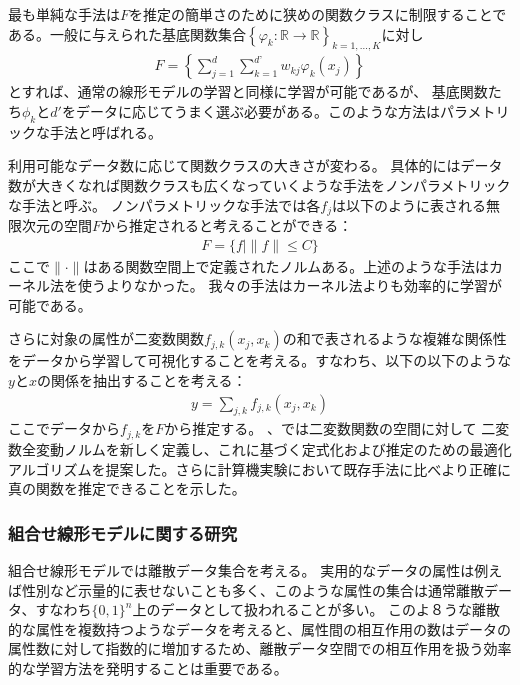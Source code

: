 最も単純な手法は$F$を推定の簡単さのために狭めの関数クラスに制限することである。一般に与えられた基底関数集合$\left\{\varphi_k:\mathbb{R} \to \mathbb{R} \right\}_{k=1,\ldots,K}$に対し
\begin{align*}
  F=\left\{  \sum_{j=1}^d\sum_{k=1}^{d’} w_{kj}\varphi_k(x_j) \right\}
\end{align*}
とすれば、通常の線形モデルの学習と同様に学習が可能であるが、
基底関数たち$\phi_k$と$d'$をデータに応じてうまく選ぶ必要がある。このような方法はパラメトリックな手法と呼ばれる。

利用可能なデータ数に応じて関数クラスの大きさが変わる。
具体的にはデータ数が大きくなれば関数クラスも広くなっていくような手法をノンパラメトリックな手法と呼ぶ。
ノンパラメトリックな手法では各$f_j$は以下のように表される無限次元の空間$F$から推定されると考えることができる：
\begin{align*}
    F = \{f | \|f\|\le C\}
\end{align*}
ここで$\|\cdot\|$はある関数空間上で定義されたノルムある。上述のような手法はカーネル法を使うよりなかった。
我々の手法はカーネル法よりも効率的に学習が可能である。

さらに対象の属性が二変数関数$f_{j,k}(x_j,x_k)$の和で表されるような複雑な関係性をデータから学習して可視化することを考える。すなわち、以下の以下のような$y$と$x$の関係を抽出することを考える：
\begin{align*}
    y = \sum_{j,k} f_{j,k} (x_j,x_k)
\end{align*}
ここでデータから$f_{j,k}$を$F$から推定する。
\cite{KM01}、\cite{KM02}では二変数関数の空間に対して
二変数全変動ノルムを新しく定義し、これに基づく定式化および推定のための最適化アルゴリズムを提案した。さらに計算機実験において既存手法に比べより正確に真の関数を推定できることを示した。


\subsubsection{組合せ線形モデルに関する研究}

組合せ線形モデルでは離散データ集合を考える。
実用的なデータの属性は例えば性別など示量的に表せないことも多く、このような属性の集合は通常離散データ、すなわち$\{0,1\}^n$上のデータとして扱われることが多い。
このよ８うな離散的な属性を複数持つようなデータを考えると、属性間の相互作用の数はデータの属性数に対して指数的に増加するため、離散データ空間での相互作用を扱う効率的な学習方法を発明することは重要である。

